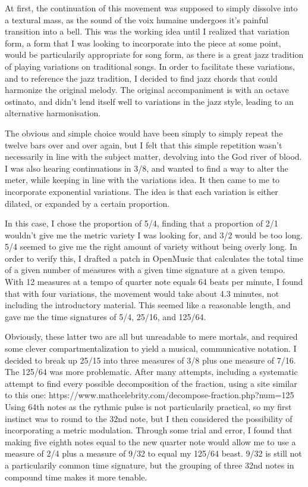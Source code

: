 \documentclass[12pt,twoside,maitrise]{dms}
\theoremstyle{definition}
\begin{document}
At first, the continuation of this movement was supposed to simply dissolve into a textural mass, as the sound of the voix humaine undergoes it's painful transition into a bell.
This was the working idea until I realized that variation form, a form that I was looking to incorporate into the piece at some point, would be particularily appropriate for song form, as there is a great jazz tradition of playing variations on traditional songs.
In order to facilitate these variations, and to reference the jazz tradition, I decided to find jazz chords that could harmonize the original melody.
The original accompaniment is with an octave ostinato, and didn't lend itself well to variations in the jazz style, leading to an alternative harmonisation.


The obvious and simple choice would have been simply to simply repeat the twelve bars over and over again, but I felt that this simple repetition wasn't necessarily in line with the subject matter, devolving into the God river of blood.
I was also hearing continuations in 3/8, and wanted to find a way to alter the meter, while keeping in line with the variations idea.
It then came to me to incorporate exponential variations.
The idea is that each variation is either dilated, or expanded by a certain proportion.

In this case, I chose the proportion of 5/4, finding that a proportion of 2/1 wouldn't give me the metric variety I was looking for, and 3/2 would be too long.
5/4 seemed to give me the right amount of variety without being overly long.
In order to verify this, I drafted a patch in OpenMusic that calculates the total time of a given number of measures with a given time signature at a given tempo.
With 12 measures at a tempo of quarter note equals 64 beats per minute, I found that with four variations, the movement would take about 4.3 minutes, not including the introductory material.
This seemed like a reasonable length, and gave me the time signatures of 5/4, 25/16, and 125/64.

Obviously, these latter two are all but unreadable to mere mortals, and required some clever compartmentalization to yield a musical, communicative notation.
I decided to break up 25/15 into three measures of 3/8 plus one measure of 7/16.
The 125/64 was more problematic.
After many attempts, including a systematic attempt to find every possible decomposition of the fraction, using a site similar to this one: https://www.mathcelebrity.com/decompose-fraction.php?num=125%
Using 64th notes as the rythmic pulse is not particularily practical, so my first instinct was to round to the 32nd note, but I then considered the possibility of incorporating a metric modulation.
Through some trial and error, I found that making five eighth notes equal to the new quarter note would allow me to use a measure of 2/4 plus a measure of 9/32 to equal my 125/64 beast.
9/32 is still not a particularily common time signature, but the grouping of three 32nd notes in compound time makes it more tenable.
\end{document}
